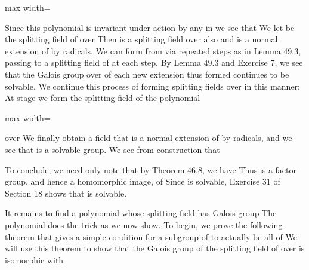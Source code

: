 \documentclass[11pt,oneside]{article}
\begin{document}
\begin{BookBody}
\begin{center}\begin{adjustbox}{max width=\linewidth}\end{adjustbox}\end{center}

\noindent Since this polynomial is invariant under action by any \BookInline{\sigma } in  we see that   We let  be the splitting field of  over  Then  is a splitting field over  also and is a normal extension of  by radicals. We can form  from  via repeated steps as in Lemma 49.3, passing to a splitting field of  at each step. By Lemma 49.3 and Exercise 7, we see that the Galois group over  of each new extension thus formed continues to be solvable. We continue this process of forming splitting fields over  in this manner: At stage  we form the splitting field of the polynomial

\begin{center}\begin{adjustbox}{max width=\linewidth}\end{adjustbox}\end{center}

\noindent over  We finally obtain a field  that is a normal extension of  by radicals, and we see that  is a solvable group. We see from construction that 

To conclude, we need only note that by Theorem 46.8, we have   Thus  is a factor group, and hence a homomorphic image, of  Since  is solvable, Exercise 31 of Section 18 shows that  is solvable. \BookEnd{\blacklozenge}


\noindent It remains to find a polynomial  whose splitting field has Galois group  The polynomial  does the trick as we now show. To begin, we prove the following theorem that gives a simple condition for a subgroup of  to actually be all of  We will use this theorem to show that the Galois group of the splitting field of  over  is isomorphic with 


\end{BookBody}
\end{document}
